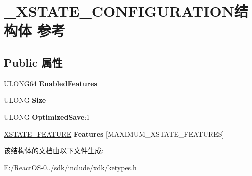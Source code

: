 \hypertarget{struct___x_s_t_a_t_e___c_o_n_f_i_g_u_r_a_t_i_o_n}{}\section{\+\_\+\+X\+S\+T\+A\+T\+E\+\_\+\+C\+O\+N\+F\+I\+G\+U\+R\+A\+T\+I\+O\+N结构体 参考}
\label{struct___x_s_t_a_t_e___c_o_n_f_i_g_u_r_a_t_i_o_n}
\subsection*{Public 属性}
\begin{DoxyCompactItemize}
\item 
\mbox{\label{struct___x_s_t_a_t_e___c_o_n_f_i_g_u_r_a_t_i_o_n_a745d1235402a1cfc1bc822e538e257ab}} 
U\+L\+O\+N\+G64 {\bfseries Enabled\+Features}
\item 
\mbox{\label{struct___x_s_t_a_t_e___c_o_n_f_i_g_u_r_a_t_i_o_n_a0b2f4933bd50903dacc858a5f956e10a}} 
U\+L\+O\+NG {\bfseries Size}
\item 
\mbox{\label{struct___x_s_t_a_t_e___c_o_n_f_i_g_u_r_a_t_i_o_n_aeac24bfd28882eec11fb5cfb746becdd}} 
U\+L\+O\+NG {\bfseries Optimized\+Save}\+:1
\item 
\mbox{\label{struct___x_s_t_a_t_e___c_o_n_f_i_g_u_r_a_t_i_o_n_a3d14c4ca9a4677573ef701dc19291337}} 
\hyperlink{struct___x_s_t_a_t_e___f_e_a_t_u_r_e}{X\+S\+T\+A\+T\+E\+\_\+\+F\+E\+A\+T\+U\+RE} {\bfseries Features} \mbox{[}M\+A\+X\+I\+M\+U\+M\+\_\+\+X\+S\+T\+A\+T\+E\+\_\+\+F\+E\+A\+T\+U\+R\+ES\mbox{]}
\end{DoxyCompactItemize}


该结构体的文档由以下文件生成\+:\begin{DoxyCompactItemize}
\item 
E\+:/\+React\+O\+S-\/0../sdk/include/xdk/ketypes.\+h\end{DoxyCompactItemize}
